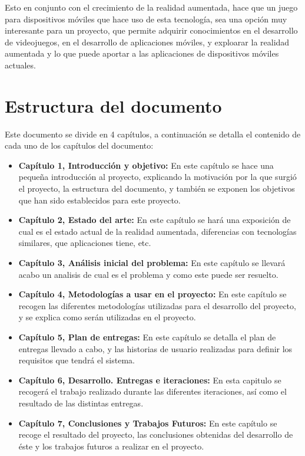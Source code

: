Esto en conjunto con el crecimiento de la realidad aumentada, hace que un juego para dispositivos móviles que hace uso de esta tecnología, sea una opción muy interesante para un proyecto, que permite adquirir conocimientos en el desarrollo de videojuegos, en el desarrollo de aplicaciones móviles, y exploarar la realidad aumentada y lo que puede aportar a las aplicaciones de dispositivos móviles actuales.

\section{Estructura del documento}
Este documento se divide en 4 capítulos, a continuación se detalla el contenido de cada uno de los capítulos del documento:
\begin{itemize}
  \item \textbf{Capítulo 1, Introducción y objetivo:} En este capítulo se hace una pequeña introducción al proyecto, explicando la motivación por la que surgió el proyecto, la estructura del documento, y también se exponen los objetivos que han sido establecidos para este proyecto.
  \item \textbf{Capítulo 2, Estado del arte:} En este capítulo se hará una exposición de cual es el estado actual de la realidad aumentada, diferencias con tecnologías similares, que aplicaciones tiene, etc.
  \item \textbf{Capítulo 3, Análisis inicial del problema:} En este capítulo se llevará acabo un analisis de cual es el problema y como este puede ser resuelto.
  \item \textbf{Capítulo 4, Metodologías a usar en el proyecto:} En este capítulo se recogen las diferentes metodologías utilizadas para el desarrollo del proyecto, y se explica como serán utilizadas en el proyecto.
  \item \textbf{Capítulo 5, Plan de entregas:} En este capítulo se detalla el plan de entregas llevado a cabo, y las historias de usuario realizadas para definir los requisitos que tendrá el sistema.
  \item \textbf{Capítulo 6, Desarrollo. Entregas e iteraciones:} En esta capitulo se recogerá el trabajo realizado durante las diferentes iteraciones, así como el resultado de las distintas entregas.
  \item \textbf{Capítulo 7, Conclusiones y Trabajos Futuros:} En este capítulo se recoge el resultado del proyecto, las conclusiones obtenidas del desarrollo de éste y los trabajos futuros a realizar en el proyecto.
\end{itemize}

